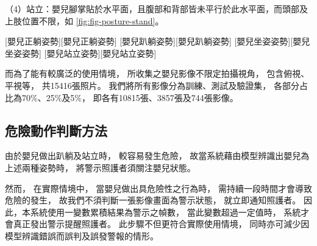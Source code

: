 \documentclass[class=NCU_thesis, crop=false]{standalone}
\begin{document}
（4）站立：嬰兒腳掌貼於水平面，且腹部和背部皆未平行於此水平面，而頭部及上肢位置不限，如
\cref{fig:fig-posture-stand}。

[嬰兒正躺姿勢][嬰兒正躺姿勢]
[嬰兒趴躺姿勢][嬰兒趴躺姿勢]
[嬰兒坐姿姿勢][嬰兒坐姿姿勢]
[嬰兒站立姿勢][嬰兒站立姿勢]

而為了能有較廣泛的使用情境，
所收集之嬰兒影像不限定拍攝視角，
包含俯視、平視等，
共15416張照片。
我們將所有影像分為訓練、測試及驗證集，
各部分占比為70\%、25\%及5\%，
即各有10815張、3857張及744張影像。

\subsection{危險動作判斷方法}
由於嬰兒做出趴躺及站立時，
較容易發生危險，
故當系統藉由模型辨識出嬰兒為上述兩種姿勢時，
將警示照護者須關注嬰兒狀態。

然而，
在實際情境中，
當嬰兒做出具危險性之行為時，
需持續一段時間才會導致危險的發生，
故我們不須判斷一張影像畫面為警示狀態，
就立即通知照護者。
因此，本系統使用一變數累積結果為警示之幀數，
當此變數超過一定值時，
系統才會真正發出警示提醒照護者。
此步驟不但更符合實際使用情境，
同時亦可減少因模型辨識錯誤而誤判及誤發警報的情形。
\end{document}
